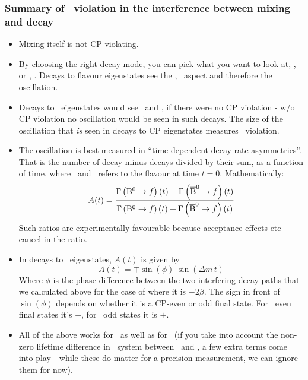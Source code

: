  \subsubsection{Summary of \cp\ violation in the interference between
 mixing and decay}
\label{sec:BCPSummary}

\begin{itemize}
 \item Mixing itself is not CP violating.
 \item By choosing the right decay mode, you can pick what you want to
 look at, \Bh, \Bl or \Bo, \Bob. Decays to flavour eigenstates see the
 \Bo, \Bob\ aspect and therefore the oscillation.
 \item Decays to \cp\ eigenstates would see \Bh\ and \Bl, if there were
 no CP violation - w/o CP violation no oscillation would be seen in
 such decays. The size of the oscillation that \emph{is} seen in decays to CP
 eigenstates measures \cp\ violation.
 \item The oscillation is best measured in ``time dependent decay rate
 asymmetries''. That is the number of  decay minus
  decays divided by their sum, as a function of time,
 where \Bdo\ and \Bdob\ refers to the flavour at time
 $t=0$. Mathematically:
\begin{equation}
\label{eq:defasy}
A\!\left(t\right) =
\frac{   \Gamma\left({\rm B^0} \to f \right)(t)
        -\Gamma\left({\rm \overline{B}^0} \to f \right)(t)
    }{
         \Gamma\left({\rm B^0} \to f \right)(t)
        +\Gamma\left({\rm \overline{B}^0} \to f \right)(t)
    }
\end{equation}
 Such ratios are experimentally favourable because acceptance effects
 etc cancel in the ratio.
 \item In decays to \cp\ eigenstates, $A(t)$ is given by
\begin{equation}
 A(t) = \mp \sin(\phi) \; \sin(\Delta\!m\, t)
\end{equation}
 Where $\phi$ is the phase difference between the two interfering
 decay paths that we calculated above for the case of  where it is $-2\beta$.  The sign in front of $\sin(\phi)$
 depends on whether it is a CP-even or odd final state. For \cp\ even
 final states it's $-$, for \cp\ odd states it is $+$.
\item All of the above works for \Bdo\ as well as for \Bso\ (if you take
  into account the non-zero lifetime difference in \Bso\ system between \Bsl\
  and \Bsh, a few extra terms come into play - while these do
  matter for a precision measurement, we can ignore them for now).
\end{itemize}

